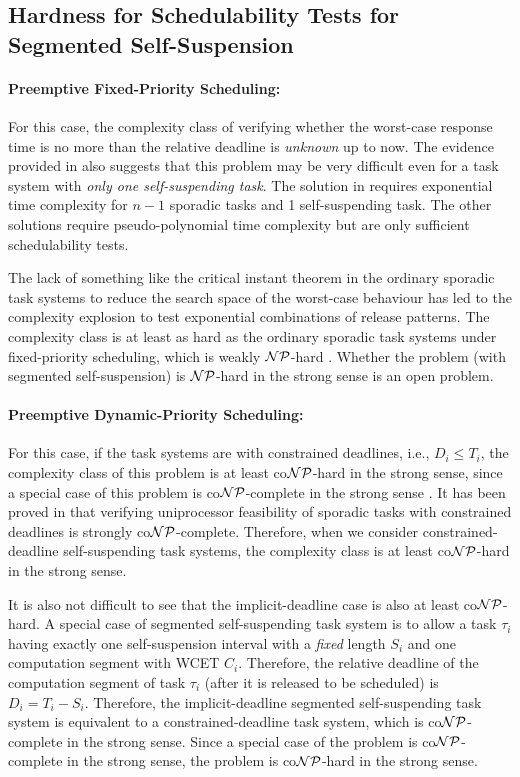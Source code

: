 \subsection{Hardness for Schedulability Tests for Segmented Self-Suspension}
\paragraph{Preemptive Fixed-Priority Scheduling:}   
For this case, the complexity class of verifying whether the worst-case response time is no more than the relative deadline is \emph{unknown} up to now. The evidence provided in \cite{ecrts15nelissen} also suggests that this problem may be very difficult even for a task system with \emph{only one self-suspending task}. The solution in \cite{ecrts15nelissen}  requires exponential time complexity for $n-1$ sporadic tasks and 1 self-suspending task. The other solutions \cite{Huang:multiseg}\cite{PH:rtss98} require pseudo-polynomial time complexity but are only sufficient schedulability tests.

The lack of something like the critical instant theorem in the ordinary sporadic task systems to reduce the search space of the worst-case behaviour has led to the complexity explosion to test exponential combinations of release patterns. The complexity class is at least as hard as the ordinary sporadic task systems under fixed-priority scheduling, which is weakly ${\cal NP}$-hard  \cite{EisenbrandR08}. Whether the problem (with segmented self-suspension) is ${\cal NP}$-hard in the strong sense is an open problem.

\paragraph{Preemptive Dynamic-Priority Scheduling:} 
For this case, if the task systems are with constrained deadlines, i.e., $D_i \leq T_i$, the complexity class of this problem is at least co${\cal NP}$-hard in the strong sense, since a special case of this problem is co${\cal NP}$-complete in the strong sense \cite{DBLP:conf/ecrts/Ekberg015}. It has been proved in \cite{DBLP:conf/ecrts/Ekberg015} that verifying uniprocessor feasibility of sporadic tasks with constrained deadlines is strongly co${\cal NP}$-complete.  Therefore, when we consider constrained-deadline self-suspending task systems, the complexity class is at least co${\cal NP}$-hard in the strong sense.

It is also not difficult to see that the implicit-deadline case is also at least co${\cal NP}$-hard.  A special case of segmented self-suspending task system is to allow a task $\tau_i$ having exactly one self-suspension interval with a \emph{fixed} length $S_i$ and one computation segment with WCET $C_i$. Therefore, the relative deadline of the computation segment of task $\tau_i$ (after it is released to be scheduled) is $D_i = T_i-S_i$. Therefore, the implicit-deadline segmented self-suspending task system is equivalent to a constrained-deadline task system, which is co${\cal NP}$-complete in the strong sense. Since a special case of the problem is co${\cal NP}$-complete in the strong sense, the problem is co${\cal NP}$-hard in the strong sense.


